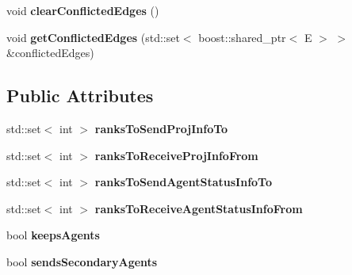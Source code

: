 \begin{DoxyCompactItemize}
\item 
\hypertarget{classrepast_1_1_graph_aae3c1f6c8031633d866eed178b5556e7}{void {\bfseries clear\-Conflicted\-Edges} ()}\label{classrepast_1_1_graph_aae3c1f6c8031633d866eed178b5556e7}

\item 
\hypertarget{classrepast_1_1_graph_a4ecd9032c3380032e5e387b421540b72}{void {\bfseries get\-Conflicted\-Edges} (std\-::set$<$ boost\-::shared\-\_\-ptr$<$ E $>$ $>$ \&conflicted\-Edges)}\label{classrepast_1_1_graph_a4ecd9032c3380032e5e387b421540b72}

\end{DoxyCompactItemize}
\subsection*{Public Attributes}
\begin{DoxyCompactItemize}
\item 
\hypertarget{classrepast_1_1_graph_a26a275229c943860f7dcc8f12a819d51}{std\-::set$<$ int $>$ {\bfseries ranks\-To\-Send\-Proj\-Info\-To}}\label{classrepast_1_1_graph_a26a275229c943860f7dcc8f12a819d51}

\item 
\hypertarget{classrepast_1_1_graph_ac6bd3c93bc7fc980daee32416c62cef5}{std\-::set$<$ int $>$ {\bfseries ranks\-To\-Receive\-Proj\-Info\-From}}\label{classrepast_1_1_graph_ac6bd3c93bc7fc980daee32416c62cef5}

\item 
\hypertarget{classrepast_1_1_graph_af6ffbf7aafeaa71373c833215d6e7361}{std\-::set$<$ int $>$ {\bfseries ranks\-To\-Send\-Agent\-Status\-Info\-To}}\label{classrepast_1_1_graph_af6ffbf7aafeaa71373c833215d6e7361}

\item 
\hypertarget{classrepast_1_1_graph_ab6aa89bc4355dc7be2e9ffcf4831b69e}{std\-::set$<$ int $>$ {\bfseries ranks\-To\-Receive\-Agent\-Status\-Info\-From}}\label{classrepast_1_1_graph_ab6aa89bc4355dc7be2e9ffcf4831b69e}

\item 
\hypertarget{classrepast_1_1_graph_a71df0c0ac35f4464ff6d72f70bead983}{bool {\bfseries keeps\-Agents}}\label{classrepast_1_1_graph_a71df0c0ac35f4464ff6d72f70bead983}

\item 
\hypertarget{classrepast_1_1_graph_accec73ce11057ca4b5019b3693e93354}{bool {\bfseries sends\-Secondary\-Agents}}\label{classrepast_1_1_graph_accec73ce11057ca4b5019b3693e93354}

\end{DoxyCompactItemize}
